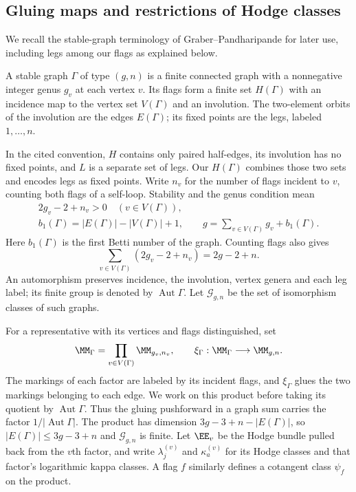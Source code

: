 \subsection{Gluing maps and restrictions of Hodge classes}
\label{subsec:s02:03}

We recall the stable-graph terminology of Graber--Pandharipande
\cite[Appendix A.1]{GP03} for later use, including legs among our
flags as explained below.

A stable graph $\Gamma$ of type $(g,n)$ is a finite connected graph
with a nonnegative integer genus $g_v$ at each vertex $v$.  Its flags
form a finite set $H(\Gamma)$ with an incidence map to the vertex set
$V(\Gamma)$ and an involution.  The two-element orbits of the
involution are the edges $E(\Gamma)$; its fixed points are the legs,
labeled $1,\ldots,n$.

In the cited convention, $H$ contains only paired half-edges, its
involution has no fixed points, and $L$ is a separate set of legs.
Our $H(\Gamma)$ combines those two sets and encodes legs as fixed
points.  Write $n_v$ for the number of flags incident
to $v$, counting both flags of a self-loop.  Stability and the genus
condition mean
\begin{equation}
\label{eq:s02:graph-genus}
\begin{gathered}
2g_v-2+n_v>0\quad(v\in V(\Gamma)),\\
b_1(\Gamma)=|E(\Gamma)|-|V(\Gamma)|+1,\qquad
g=\sum_{v\in V(\Gamma)}g_v+b_1(\Gamma).
\end{gathered}
\end{equation}
Here $b_1(\Gamma)$ is the first Betti number of the graph.  Counting
flags also gives
\begin{equation}
\label{eq:s02:graph-stability-sum}
\sum_{v\in V(\Gamma)}(2g_v-2+n_v)=2g-2+n.
\end{equation}
An automorphism preserves incidence, the involution, vertex genera and
each leg label; its finite group is denoted by
$\operatorname{Aut}\Gamma$.  Let $\mathcal G_{g,n}$ be the set of
isomorphism classes of such graphs.

For a representative with its vertices and flags distinguished, set
\begin{equation}
\label{eq:s02:gluing-map}
\MM_\Gamma=\prod_{v\in V(\Gamma)}\MM_{g_v,n_v},
\qquad
\xi_\Gamma:\MM_\Gamma\longrightarrow\MM_{g,n}.
\end{equation}
The markings of each factor are labeled by its incident flags, and
$\xi_\Gamma$ glues the two markings belonging to each edge.  We work
on this product before taking its quotient by
$\operatorname{Aut}\Gamma$.  Thus the gluing pushforward in a graph
sum carries the factor $1/|\operatorname{Aut}\Gamma|$.  The product
has dimension $3g-3+n-|E(\Gamma)|$, so $|E(\Gamma)|\leq3g-3+n$
and $\mathcal G_{g,n}$ is finite.  Let $\EE_v$ be the Hodge bundle
pulled back from the $v$th factor, and write $\lambda_j^{(v)}$ and
$\kappa_a^{(v)}$ for its Hodge classes and that factor's logarithmic
kappa classes.  A flag $f$ similarly defines a cotangent class
$\psi_f$ on the product.

